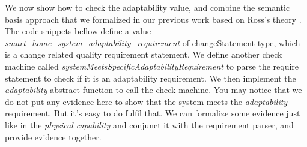 \documentclass[conference]{IEEEtran}
\begin{document}
We now show how to check the adaptability value, and combine the semantic basis approach that we formalized in our previous work \cite{Dou:evolutionary} based on Ross's theory \cite{Ross:semantic}. The code snippets bellow define a value {\em smart\_home\_system\_adaptability\_requirement} of changeStatement type, which is a change related quality requirement statement. We define another check machine called {\em systemMeetsSpecificAdaptabilityRequirement} to parse the require statement to check if it is an adaptability requirement. We then implement the {\em adaptability} abstract function to call the check machine. You may notice that we do not put any evidence here to show that the system meets the {\em adaptability} requirement. But it's easy to do fulfil that. We can formalize some evidence just like in the {\em physical capability} and conjunct it with the requirement parser, and provide evidence together.
\end{document}
